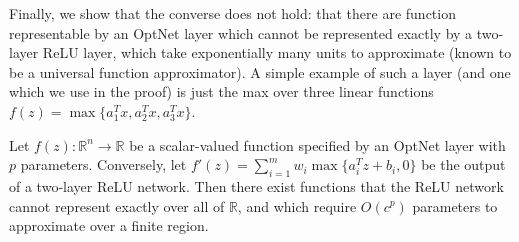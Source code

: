 Finally, we show that the converse does not hold: that there are function
representable by an OptNet layer which cannot be represented exactly by a
two-layer ReLU layer, which take exponentially many units to approximate
(known to be a universal function approximator).  A simple example
of such a layer (and one which we use in the proof) is just the max over three
linear functions  $f(z) = \max \{a_1^T x, a_2^Tx, a_3^T x\}$.

\begin{theorem}
    \label{theorem:rep}
    Let $f(z) : \mathbb{R}^{n} \rightarrow \mathbb{R}$ be a scalar-valued function
    specified by an OptNet layer with $p$ parameters.  Conversely, let
    $f'(z) = \sum_{i=1}^m w_i \max\{a_i^Tz + b_i, 0\}$ be the output of a
    two-layer ReLU network.
    Then there exist functions that the ReLU network cannot represent
    exactly over all of $\mathbb{R}$, and which require $O(c^p)$ parameters to
    approximate over a finite region.
\end{theorem}

